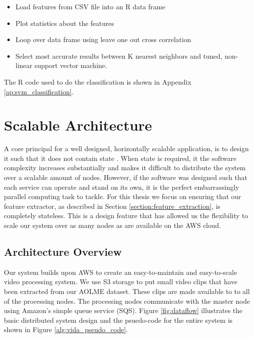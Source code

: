 \begin{itemize}
  \item Load features from CSV file into an R data frame
  \item Plot statistics about the features
  \item Loop over data frame using leave one out cross correlation
  \item Select most accurate results between K nearest neighbors and tuned, non-linear
  support vector machine.
\end{itemize}

The R code used to do the classification is shown in Appendix
\ref{ap:svm_classification}.

\section{\label{section:distributed_processing}Scalable Architecture}
A core principal for a well designed, horizontally scalable application, is
to design it such that it does not contain state \cite{awsbestpractices}.
When state is required, it the software complexity increases substantially and
makes it difficult to distribute the system over a scalable amount of nodes.
However, if the software was designed such that each service can operate and
stand on its own, it is the perfect embarrassingly parallel computing task to
tackle. For this thesis we focus on ensuring that our feature extractor,
as described in Section \ref{section:feature_extraction}, is completely stateless.
This is a design feature that has allowed us the flexibility to scale our
system over as many nodes as are available on the AWS cloud.

\subsection{\label{subsection:architecture_overview}Architecture Overview}
Our system builds upon AWS to create an easy-to-maintain and easy-to-scale
video processing system. We use S3 storage to put small video clips that
have been extracted from our AOLME dataset. These clips are made available to
to all of the processing nodes. The processing nodes communicate with the master
node using Amazon's simple queue service (SQS). Figure \ref{fig:dataflow} illustrates
the basic distributed system design and the psuedo-code for the entire system
is shown in Figure \ref{alg:vida_pseudo_code}.

